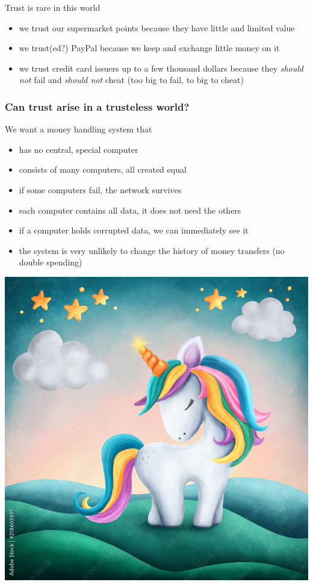 \documentclass[11pt]{beamer}  %
\begin{document}
\begin{frame}{Trust is rare in this world}

  \begin{itemize}
  \item we trust our supermarket points because they have little and limited value
  \item we trust(ed?) PayPal because we keep and exchange little money on it
  \item we trust credit card issuers up to a few thousand dollars
    because they \emph{should not} fail
    and \emph{should not} cheat (too big to fail, to big to cheat)
  \end{itemize}

\end{frame}

\begin{frame}\frametitle{Can trust arise in a trusteless world?}

  \begin{greenbox}{We want a money handling system that}
    \begin{itemize}
    \item has no central, special computer
    \item consists of many computers, all created equal
    \item if some computers fail, the network survives
    \item each computer contains all data, it does not need the others
    \item if a computer holds corrupted data, we can immediately see it
    \item the system is very unlikely to change the history of money transfers
      (no double spending)
    \end{itemize}
  \end{greenbox}

  \begin{center}
    \includegraphics[scale=0.3,clip=false]{pictures/unicorn.jpg}
  \end{center}


\end{frame}
\end{document}
